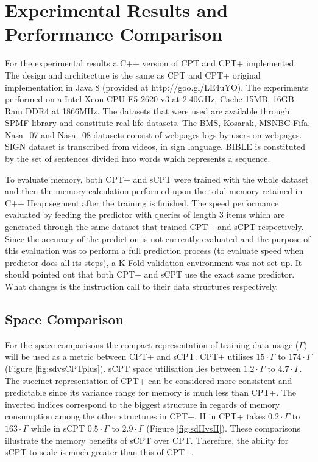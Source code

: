 \section{Experimental Results and Performance Comparison} \label{experimental}
For the experimental results a C++ version of CPT and CPT+ implemented. The design and architecture is the same as CPT and CPT+ original implementation in Java 8 (provided at http://goo.gl/LE4uYO). The experiments performed on a Intel Xeon CPU E5-2620 v3 at 2.40GHz, Cache 15MB, 16GB Ram DDR4 at 1866MHz. The datasets that were used are available through SPMF library \cite{spmf} and constitute real life datasets. The BMS, Kosarak, MSNBC Fifa, Nasa\_07 and Nasa\_08 datasets consist of webpages logs by users on webpages. SIGN dataset is transcribed from videos, in sign language. BIBLE is constituted by the set of sentences divided into words which represents a sequence. 
\par To evaluate memory, both CPT+ and sCPT were trained with the whole dataset and then the memory calculation performed upon the total memory retained in C++ Heap segment after the training is finished. The speed performance evaluated by feeding the predictor with queries of length 3 items which are generated through the same dataset that trained CPT+ and sCPT respectively. Since the accuracy of the prediction is not currently evaluated and the purpose of this evaluation was to perform a full prediction process (to evaluate speed when predictor does all its steps), a K-Fold \cite{Kohavi} validation environment was not set up. It should pointed out that both CPT+ and sCPT use the exact same predictor. What changes is the instruction call to their data structures respectively.


\subsection*{Space Comparison}
For the space comparisons the compact representation of training data usage ($\Gamma$) will be used as a metric between CPT+ and sCPT. CPT+ utilises $15 \cdot \Gamma$ to $174 \cdot \Gamma$ (Figure \ref{fig:sdvsCPTplus}). sCPT space utilisation lies between $1.2 \cdot \Gamma$ to $4.7 \cdot \Gamma$. The succinct representation of CPT+ can be considered more consistent and predictable since its variance range for memory is much less than CPT+. The inverted indices correspond to the biggest structure in regards of memory consumption among the other structures in CPT+. II in CPT+ takes $0.2 \cdot \Gamma$ to $163 \cdot \Gamma$ while in sCPT $0.5 \cdot \Gamma$ to $2.9 \cdot \Gamma$ (Figure \ref{fig:sdIIvsII}). These comparisons illustrate the memory benefits of sCPT over CPT. Therefore, the ability for sCPT to scale is much greater than this of CPT+.
